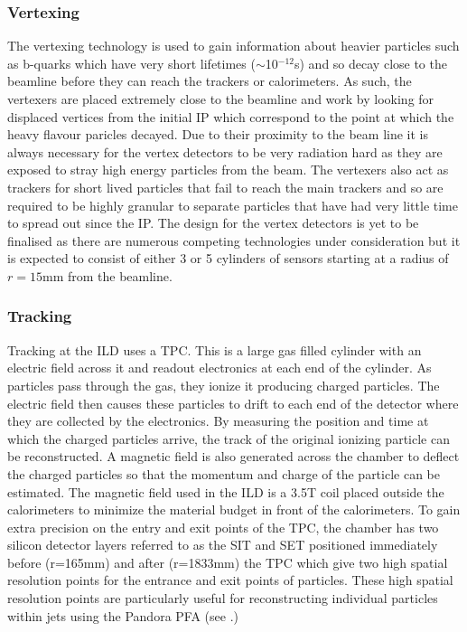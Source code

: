 \subsubsection{Vertexing}
The vertexing technology is used to gain information about heavier particles such as b-quarks which have very short lifetimes ($\sim$10$^{-12}$s) and so decay close to the beamline before they can reach the trackers or calorimeters. As such, the vertexers are placed extremely close to the beamline and work by looking for displaced vertices from the initial \ac{IP} which correspond to the point at which the heavy flavour paricles decayed. Due to their proximity to the beam line it is always necessary for the vertex detectors to be very radiation hard as they are exposed to stray high energy particles from the beam. The vertexers also act as trackers for short lived particles that fail to reach the main trackers and so are required to be highly granular to separate particles that have had very little time to spread out since the \ac{IP}. The design for the vertex detectors is yet to be finalised as there are numerous competing technologies under consideration but it is expected to consist of either 3 or 5 cylinders of sensors starting at a radius of $r=15$mm from the beamline.

\subsubsection{Tracking}
Tracking at the \ac{ILD} uses a \ac{TPC}. This is a large gas filled cylinder with an electric field across it and readout electronics at each end of the cylinder. As particles pass through the gas, they ionize it producing charged particles. The electric field then causes these particles to drift to each end of the detector where they are collected by the electronics. By measuring the position and time at which the charged particles arrive, the track of the original ionizing particle can be reconstructed. A magnetic field is also generated across the chamber to deflect the charged particles so that the momentum and charge of the particle can be estimated. The magnetic field used in the ILD is a 3.5T coil placed outside the calorimeters to minimize the material budget in front of the calorimeters. To gain extra precision on the entry and exit points of the \ac{TPC}, the chamber has two silicon detector layers referred to as the \ac{SIT} and \ac{SET} positioned  immediately before (r=165mm) and after (r=1833mm) the \ac{TPC} which give two high spatial resolution points for the entrance and exit points of particles. These high spatial resolution points are particularly useful for reconstructing individual particles within jets using the Pandora \ac{PFA} (see .)

